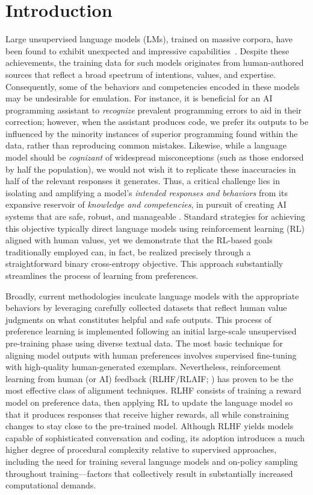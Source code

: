 \section{Introduction}
Large unsupervised language models (LMs), trained on massive corpora, have been found to exhibit unexpected and impressive capabilities~\citep{chowdhery2022palm, brown2020language, touvron2023llama,bubeck2023sparks}. Despite these achievements, the training data for such models originates from human-authored sources that reflect a broad spectrum of intentions, values, and expertise. Consequently, some of the behaviors and competencies encoded in these models may be undesirable for emulation. For instance, it is beneficial for an AI programming assistant to \textit{recognize} prevalent programming errors to aid in their correction; however, when the assistant produces code, we prefer its outputs to be influenced by the minority instances of superior programming found within the data, rather than reproducing common mistakes. Likewise, while a language model should be \textit{cognizant} of widespread misconceptions (such as those endorsed by half the population), we would not wish it to replicate these inaccuracies in half of the relevant responses it generates. Thus, a critical challenge lies in isolating and amplifying a model’s \emph{intended responses and behaviors} from its expansive reservoir of \textit{knowledge and competencies}, in pursuit of creating AI systems that are safe, robust, and manageable \citep{ouyang2022training}. Standard strategies for achieving this objective typically direct language models using reinforcement learning (RL) aligned with human values, yet we demonstrate that the RL-based goals traditionally employed can, in fact, be realized precisely through a straightforward binary cross-entropy objective. This approach substantially streamlines the process of learning from preferences.

Broadly, current methodologies inculcate language models with the appropriate behaviors by leveraging carefully collected datasets that reflect human value judgments on what constitutes helpful and safe outputs. This process of preference learning is implemented following an initial large-scale unsupervised pre-training phase using diverse textual data. The most basic technique for aligning model outputs with human preferences involves supervised fine-tuning with high-quality human-generated exemplars. Nevertheless, reinforcement learning from human (or AI) feedback (RLHF/RLAIF; \citep{christiano2017deep,bai2022constitutional}) has proven to be the most effective class of alignment techniques. RLHF consists of training a reward model on preference data, then applying RL to update the language model so that it produces responses that receive higher rewards, all while constraining changes to stay close to the pre-trained model. Although RLHF yields models capable of sophisticated conversation and coding, its adoption introduces a much higher degree of procedural complexity relative to supervised approaches, including the need for training several language models and on-policy sampling throughout training—factors that collectively result in substantially increased computational demands.

